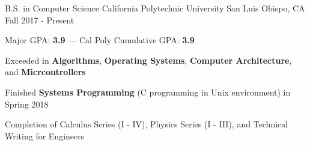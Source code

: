 

\begin{cventries}

  \cventry
    {B.S. in Computer Science} %
    {California Polytechnic University} %
    {San Luis Obispo, CA} %
    {Fall 2017 - Present} %
    {
      \begin{cvitems} %
        \item {Major GPA: \textbf{3.9} --- Cal Poly Cumulative GPA: \textbf{3.9}}
        \item {Exceeded in \textbf{Algorithms}, \textbf{Operating Systems}, \textbf{Computer Architecture}, and \textbf{Micrcontrollers}}
        \item {Finished \textbf{Systems Programming} (C programming in Unix environment) in Spring 2018}
        \item {Completion of Calculus Series (I - IV), Physics Series (I - III), and Technical Writing for Engineers}
      \end{cvitems}
    }

\end{cventries}
